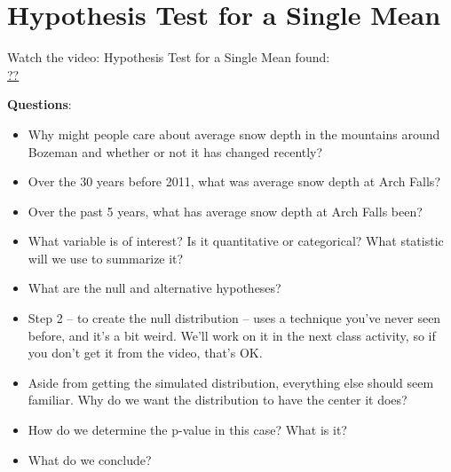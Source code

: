 \def\theTopic{Reading 13}

\section{ Hypothesis Test for a Single Mean}

Watch the video: Hypothesis Test for a Single Mean found:\\
\url{??}

{\bf Questions}:
\begin{itemize}
  \item Why might people care about average snow depth in the
    mountains around Bozeman and whether or not it has changed
    recently?\vspace{2cm}
  \item Over the 30 years before 2011, what was average snow depth at
    Arch Falls?\vspace{2cm} %
  \item Over the past 5 years, what has average snow depth at Arch
    Falls been? \vspace{2cm}%
  \item What variable is of interest? Is it quantitative or
    categorical? What statistic will we use to summarize it?\vspace{2cm}
  \item What are the null and alternative hypotheses?\vspace{2cm}
  \item Step 2 -- to create the null distribution -- uses a technique
    you've never seen before, and it's a bit weird. We'll work on it
    in the next class activity, so if you don't get it from the video,
    that's OK.\vspace{2cm}
  \item Aside from getting the simulated distribution, everything else
    should seem familiar. Why do we want the distribution to have the
    center it does?\vspace{2cm}
  \item How do we determine the p-value in this case? What is
    it?\vspace{2cm}  
  \item What do we conclude?\vspace*{\fill}
\end{itemize}


